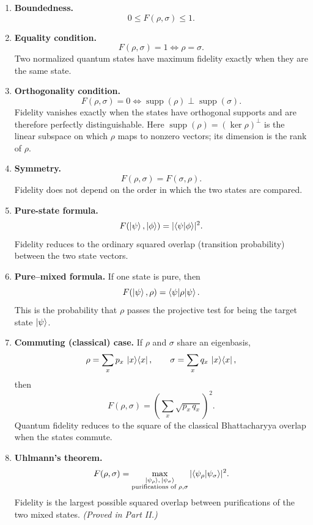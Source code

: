 \documentclass[11pt]{article}
\newcommand{\supp}{\operatorname{supp}}
\begin{document}
\begin{enumerate}[label=\textbf{\arabic*.}, leftmargin=*, itemsep=6pt]

\item \textbf{Boundedness.}
\[
0 \le F(\rho,\sigma) \le 1.
\]

\item \textbf{Equality condition.}
\[
F(\rho,\sigma) = 1 \iff \rho = \sigma.
\]
Two normalized quantum states have maximum fidelity exactly when they are the
same state.

\item \textbf{Orthogonality condition.}
\[
F(\rho,\sigma) = 0 \iff \supp(\rho)\perp\supp(\sigma).
\]
Fidelity vanishes exactly when the states have orthogonal supports and are
therefore perfectly distinguishable. Here $\supp(\rho)=(\ker\rho)^{\perp}$ is
the linear subspace on which $\rho$ maps to nonzero vectors; its dimension is
the rank of $\rho$.

\item \textbf{Symmetry.}
\[
F(\rho,\sigma) = F(\sigma,\rho).
\]
Fidelity does not depend on the order in which the two states are compared.

\item \textbf{Pure-state formula.}
\[
F(\ket{\psi},\ket{\phi}) = |\!\braket{\psi|\phi}\!|^{2}.
\]
Fidelity reduces to the ordinary squared overlap (transition probability)
between the two state vectors.

\item \textbf{Pure--mixed formula.}
If one state is pure, then
\[
F(\ket{\psi},\rho) = \braket{\psi|\rho|\psi}.
\]
This is the probability that $\rho$ passes the projective test for being the
target state $\ket{\psi}$.

\item \textbf{Commuting (classical) case.}
If $\rho$ and $\sigma$ share an eigenbasis,
\[
\rho = \sum_x p_x\,\ket{x}\!\bra{x},
\qquad
\sigma = \sum_x q_x\,\ket{x}\!\bra{x},
\]
then
\[
F(\rho,\sigma) = \left(\sum_x \sqrt{p_x\,q_x}\right)^{2}.
\]
Quantum fidelity reduces to the square of the classical Bhattacharyya overlap
when the states commute.

\item \textbf{Uhlmann's theorem.}
\[
F(\rho,\sigma) = \max_{\substack{\ket{\psi_\rho},\,\ket{\psi_\sigma}\\ \text{purifications of }\rho,\sigma}}
|\!\braket{\psi_\rho|\psi_\sigma}\!|^{2}.
\]
Fidelity is the largest possible squared overlap between purifications of the
two mixed states. \emph{(Proved in Part II.)}


\end{enumerate}
\end{document}
